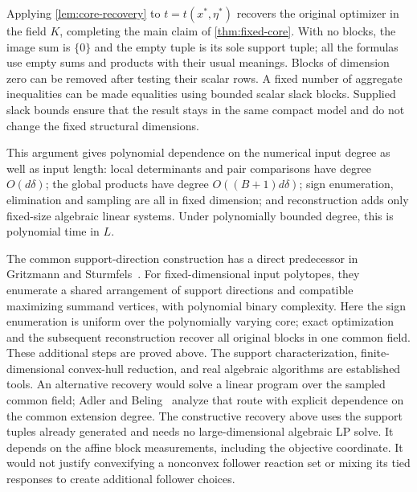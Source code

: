 Applying \cref{lem:core-recovery} to
$t=t(x^*,\eta^*)$ recovers the original optimizer in the field $K$,
completing the main claim of \cref{thm:fixed-core}. With no blocks,
the image sum is $\{0\}$ and the empty tuple is its sole support tuple;
all the formulas use empty sums and products with their usual meanings.
Blocks of dimension zero can be removed after testing their scalar rows.
A fixed number of aggregate inequalities can be made equalities using
bounded scalar slack blocks. Supplied slack bounds ensure that the
result stays in the same compact model and do not change the fixed
structural dimensions.

This argument gives polynomial dependence on the numerical input degree
as well as input length: local determinants and pair comparisons have
degree $O(d\delta)$; the global products have degree
$O((B+1)d\delta)$; sign enumeration, elimination and sampling are all
in fixed dimension; and reconstruction adds only fixed-size algebraic
linear systems. Under polynomially bounded degree, this is polynomial
time in $L$.

The common support-direction construction has a direct predecessor in
Gritzmann and Sturmfels~\cite[Algorithm 2.3.6, Theorem 2.3.7, and
Corollary 2.3.10]{GritzmannSturmfels1993}. For fixed-dimensional input
polytopes, they enumerate a shared arrangement of support directions and
compatible maximizing summand vertices, with polynomial binary complexity.
Here the sign enumeration is uniform over the polynomially varying core;
exact optimization and the subsequent reconstruction recover all original
blocks in one common field. These additional steps are proved above.
The support characterization, finite-dimensional convex-hull reduction,
and real algebraic algorithms are established tools. An alternative
recovery would solve a linear program over the sampled common field;
Adler and Beling~\cite{AdlerBeling1994} analyze that route with explicit
dependence on the common extension degree. The constructive recovery
above uses the support tuples already generated and needs no
large-dimensional algebraic LP solve. It depends on the affine block
measurements, including the objective coordinate. It would not justify
convexifying a nonconvex follower reaction set or mixing its tied
responses to create additional follower choices.
